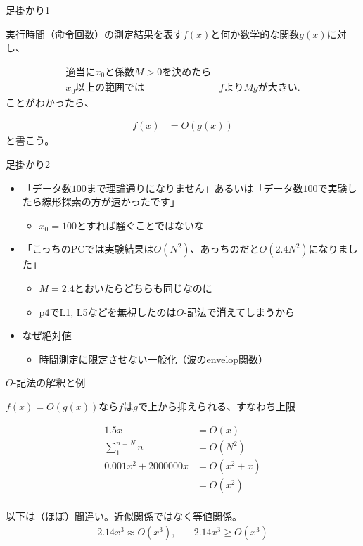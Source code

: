 \documentclass{beamer}
\begin{document}
\begin{frame}[fragile]{足掛かり1}{}

実行時間（命令回数）の測定結果を表す$f(x)$と何か数学的な関数$g(x)$に対し、

\begin{align*}
適当に x_{0}と係数M > 0を決めたら & \\
x_{0}以上の範囲では& fより M g が大きい.
\end{align*}
ことがわかったら、

\begin{align*}
f(x) &= O(g(x))
\end{align*}
と書こう。
\end{frame}

\begin{frame}[fragile]{足掛かり2}{}

\begin{itemize}\itemsep20pt
\item 「データ数$100$まで理論通りになりません」あるいは「データ数$100$で実験したら線形探索の方が速かったです」
\begin{itemize}
\item $x_{0} = 100$とすれば騒ぐことではないな
\end{itemize}
\item 「こっちのPCでは実験結果は$O(N^2)$、あっちのだと$O(2.4N^2)$になりました」
\begin{itemize}
\item $M=2.4$とおいたらどちらも同じなのに
\item p4でL1, L5などを無視したのは$O$-記法で消えてしまうから
\end{itemize}
\item なぜ絶対値
\begin{itemize}%
\item 時間測定に限定させない一般化（波のenvelop関数）
\end{itemize}
\end{itemize}
\end{frame}

\begin{frame}[fragile]{$O$-記法の解釈と例}{}

$f(x) = O(g(x))$なら$f$は$g$で上から抑えられる、すなわち上限

\begin{align*}
1.5 x & = O(x) \\
\sum_{1}^{n=N} n & = O(N^2) \\
0.001x^2 + 2000000x & = O(x^2 + x) \\
         & = O(x^2) \\
\end{align*}

\vfill
以下は（ほぼ）間違い。近似関係ではなく等値関係。
\begin{align*}
2.14x^3 \approx O(x^3), &\quad 2.14x^3 \ge O(x^3)
\end{align*}
\end{frame}
\end{document}
